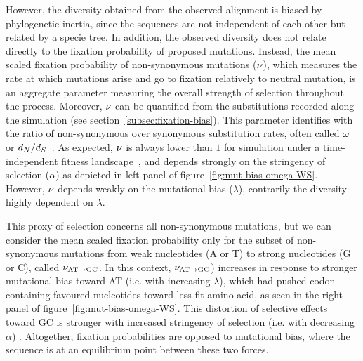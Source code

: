 
However, the diversity obtained from the observed alignment is biased by phylogenetic inertia, since the sequences are not independent of each other but related by a specie tree.
In addition, the observed diversity does not relate directly to the fixation probability of proposed mutations.
Instead, the mean scaled fixation probability of non-synonymous mutations ($\nu$), which measures the rate at which mutations arise and go to fixation relatively to neutral mutation, is an aggregate parameter measuring the overall strength of selection throughout the process.
Moreover, $\nu$ can be quantified from the substitutions recorded along the simulation (see section~\ref{subsec:fixation-bias}).
This parameter identifies with the ratio of non-synonymous over synonymous substitution rates, often called $\omega$ or $d_N / d_S$~\citep{Spielman2015, DosReis2015, Jones2016}.
As expected, $\nu$ is always lower than $1$ for simulation under a time-independent fitness landscape~\citep{Spielman2015}, and depends strongly on the stringency of selection ($\alpha$) as depicted in left panel of figure~\ref{fig:mut-bias-omega-WS}.
However, $\nu$ depends weakly on the mutational bias ($\lambda$), contrarily the diversity highly dependent on $\lambda$.

This proxy of selection concerns all non-synonymous mutations, but we can consider the mean scaled fixation probability only for the subset of non-synonymous mutations from weak nucleotides (A or T) to strong nucleotides (G or C), called $\nu_{\text{AT} \rightarrow \text{GC}}$.
In this context, $\nu_{\text{AT} \rightarrow \text{GC}}$) increases in response to stronger mutational bias toward AT (i.e. with increasing $\lambda$), which had pushed codon containing favoured nucleotides toward less fit amino acid, as seen in the right panel of figure~\ref{fig:mut-bias-omega-WS}.
This distortion of selective effects toward GC is stronger with increased stringency of selection (i.e. with decreasing $\alpha$) .
Altogether, fixation probabilities are opposed to mutational bias, where the sequence is at an equilibrium point between these two forces.

